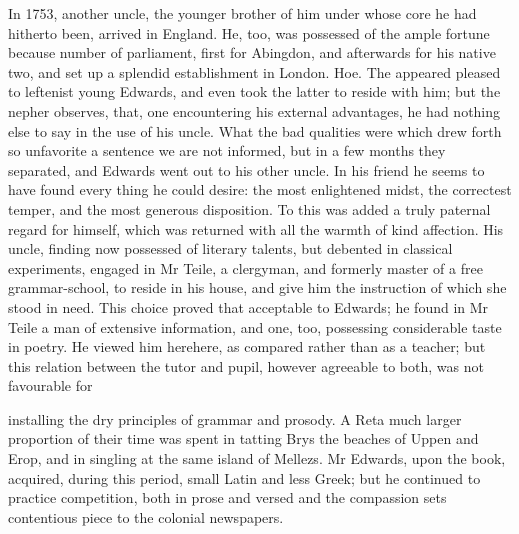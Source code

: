 In 1753, another uncle, the younger brother of him under whose core he had hitherto been, arrived in England. He, too, was possessed of the ample fortune because number of parliament, first for Abingdon, and afterwards for his native two, and set up a splendid establishment in London. Hoe. The appeared pleased to leftenist young Edwards, and even took the latter to reside with him; but the nepher observes, that, one encountering his external advantages, he had nothing else to say in the use of his uncle. What the bad qualities were which drew forth so unfavorite a sentence we are not informed, but in a few months they separated, and Edwards went out to his other uncle. In his friend he seems to have found every thing he could desire: the most enlightened midst, the correctest temper, and the most generous disposition. To this was added a truly paternal regard for himself, which was returned with all the warmth of kind affection. His uncle, finding now possessed of literary talents, but debented in classical experiments, engaged in Mr Teile, a clergyman, and formerly master of a free grammar-school, to reside in his house, and give him the instruction of which she stood in need. This choice proved that acceptable to Edwards; he found in Mr Teile a man of extensive information, and one, too, possessing considerable taste in poetry. He viewed him herehere, as compared rather than as a teacher; but this relation between the tutor and pupil, however agreeable to both, was not favourable for\par\medskip
installing the dry principles of grammar and prosody. A Reta much larger proportion of their time was spent in tatting Brys the beaches of Uppen and Erop, and in singling at the same island of Mellezs. Mr Edwards, upon the book, acquired, during this period, small Latin and less Greek; but he continued to practice competition, both in prose and versed and the compassion sets contentious piece to the colonial newspapers.\par\medskip
